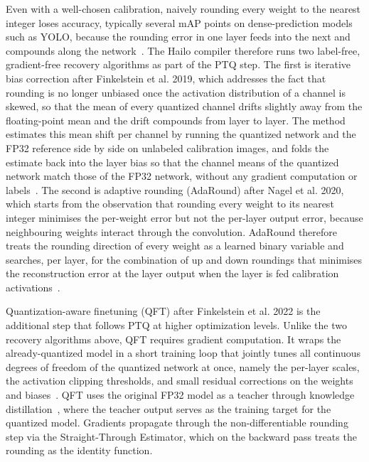 \documentclass[12pt,oneside,bibtotoc,liststotoc]{scrbook}
\begin{document}
Even with a well-chosen calibration, naively rounding every weight to
the nearest integer loses accuracy, typically several mAP points on
dense-prediction models such as YOLO, because the rounding error in
one layer feeds into the next and compounds along the
network~\cite{nagel2020adaround}. The Hailo compiler therefore runs
two label-free, gradient-free recovery algorithms as part of the PTQ
step. The first is iterative
bias correction after Finkelstein et al. 2019, which addresses the
fact that rounding is no longer unbiased once the activation
distribution of a channel is skewed, so that the mean of every
quantized channel drifts slightly away from the floating-point mean
and the drift compounds from layer to layer. The method estimates this
mean shift per channel by running the quantized network and the FP32
reference side by side on unlabeled calibration images, and folds the
estimate back into the layer bias so that the channel means of the
quantized network match those of the FP32 network, without any
gradient computation or labels~\cite{finkelstein2019ibc}. The second
is adaptive rounding (AdaRound) after Nagel et al. 2020, which starts
from the observation that rounding every weight to its nearest integer
minimises the per-weight error but not the per-layer output error,
because neighbouring weights interact through the convolution.
AdaRound therefore treats the rounding direction of every weight as a
learned binary variable and searches, per layer, for the combination
of up and down roundings that minimises the reconstruction error at
the layer output when the layer is fed calibration
activations~\cite{nagel2020adaround}.

Quantization-aware finetuning (QFT) after Finkelstein et al. 2022 is
the additional step that follows PTQ at higher optimization levels.
Unlike the two recovery algorithms above, QFT requires gradient
computation. It wraps the already-quantized model in a short training
loop that jointly tunes all continuous degrees of freedom of the
quantized network at once, namely the per-layer scales, the activation
clipping thresholds, and small residual corrections on the weights and
biases~\cite{finkelstein2022qft}. QFT uses the original FP32 model as
a teacher through knowledge
distillation~\cite{hinton2015knowledgeDistillation}, where the
teacher output serves as the training target for the quantized model.
Gradients propagate through the non-differentiable rounding step via
the Straight-Through Estimator, which on the backward pass treats the
rounding as the identity
function.~\cite{gholami2021surveyQuantization, hailoQuantizationFineTuning}
\end{document}
